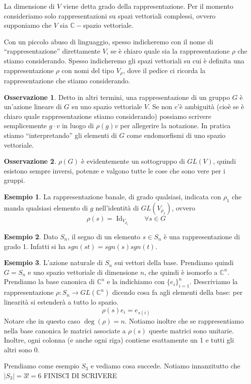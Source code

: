 \documentclass[11pt]{article}
\theoremstyle{plain}
\theoremstyle{definition}
\newtheorem{exmp}{Esempio}[section]
\newtheorem*{rem}{Osservazione}
\theoremstyle{remark}
\newcommand{\C}{\mathbb{C}}
\DeclareMathOperator{\Id}{Id}
\begin{document}
La dimensione di $V$ viene detta grado della rappresentazione.
Per il momento consideriamo solo rappresentazioni su spazi vettoriali complessi, ovvero supponiamo che $V$ sia $\C-$spazio vettoriale.

Con un piccolo abuso di linguaggio, spesso indicheremo con il nome di ``rappresentazione'' direttamente $V$, se è chiaro quale sia
la rappresentazione $\rho$ che stiamo considerando. Spesso indicheremo gli spazi vettoriali
su cui è definita una rappresentazione $\rho$ con nomi del tipo $V_\rho$, dove il pedice ci ricorda la rappresentazione che stiamo considerando.

\begin{rem}
Detto in altri termini, una rappresentazione di un gruppo $G$ è un'azione lineare di $G$ su uno spazio vettoriale $V$.
Se non c'è ambiguità (cioè se è chiaro quale rappresentazione stiamo considerando)
possiamo scrivere semplicemente $g\cdot v$ in luogo di $\rho(g)v$ per allegerire la notazione.
In pratica stiamo ``interpretando'' gli elementi di $G$ come endomorfismi di uno spazio vettoriale.
\end{rem}

\begin{rem}
$\rho(G)$ è evidentemente un sottogruppo di $GL(V)$, quindi esistono sempre inversi, potenze e valgono tutte le cose che sono vere per i gruppi.
\end{rem}


\begin{exmp}
   La rappresentazione banale, di grado qualsiasi, indicata con $\rho_1$ che manda qualsiasi elemento di $g$ nell'identità di $GL(V_{\rho_1})$, ovvero
	\[ \rho(s ) = \Id_{V_{\rho_1}} \qquad \forall s \in G\]
\end{exmp}
\begin{exmp}
   Dato $S_n$, il segno di un elemento $s\in S_n$ è una rappresentazione di grado 1. Infatti si ha $sgn(st) = sgn(s) sgn(t)$.
\end{exmp}
\begin{exmp}
   L'azione naturale di $S_n$ sui vettori della base. Prendiamo quindi $G = S_n$ e uno spazio vettoriale di dimensione $n$, che quindi è isomorfo a $\C^n$. Prendiamo la base canonica di $\C^n$ e la indichiamo con $\{e_i\}_{i=1}^n$. Descriviamo la rappresentazione $\rho: S_n \to GL(\C^n)$ dicendo cosa fa agli elementi della base: per linearità si estenderà a tutto lo spazio.
	\[ \rho(s) e_i = e_{s(i)}\]
	Notare che in questo caso $\deg(\rho) = n$. Notiamo inoltre che se rappresentiamo nella base canonica le matrici associate a $\rho(s)$ queste matrici sono unitarie. Inoltre, ogni colonna (e anche ogni riga) contiene esattamente un 1 e tutti gli altri sono 0.

	Prendiamo come esempio $S_3$ e vediamo cosa succede. Notiamo innanzitutto che $ |S_3| = 3! = 6$
	FINISCI DI SCRIVERE
\end{exmp}
\end{document}
